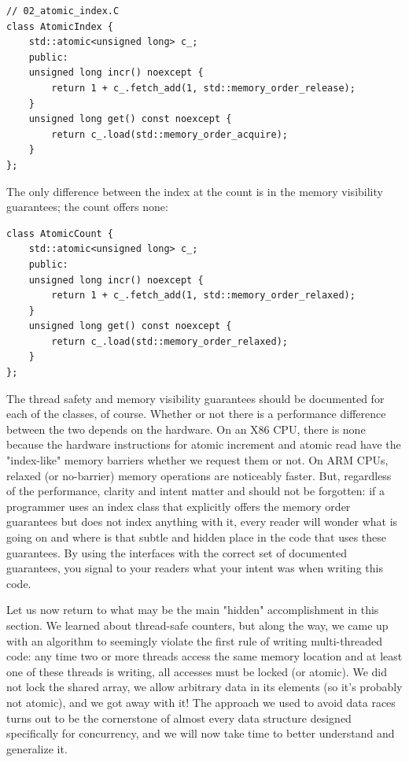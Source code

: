 \begin{lstlisting}[style=styleCXX]
// 02_atomic_index.C
class AtomicIndex {
	std::atomic<unsigned long> c_;
	public:
	unsigned long incr() noexcept {
		return 1 + c_.fetch_add(1, std::memory_order_release);
	}
	unsigned long get() const noexcept {
		return c_.load(std::memory_order_acquire);
	}
};
\end{lstlisting}

The only difference between the index at the count is in the memory visibility guarantees; the count offers none:

\begin{lstlisting}[style=styleCXX]
class AtomicCount {
	std::atomic<unsigned long> c_;
	public:
	unsigned long incr() noexcept {
		return 1 + c_.fetch_add(1, std::memory_order_relaxed);
	}
	unsigned long get() const noexcept {
		return c_.load(std::memory_order_relaxed);
	}
};
\end{lstlisting}

The thread safety and memory visibility guarantees should be documented for each of the classes, of course. Whether or not there is a performance difference between the two depends on the hardware. On an X86 CPU, there is none because the hardware instructions for atomic increment and atomic read have the "index-like" memory barriers whether we request them or not. On ARM CPUs, relaxed (or no-barrier) memory operations are noticeably faster. But, regardless of the performance, clarity and intent matter and should not be forgotten: if a programmer uses an index class that explicitly offers the memory order guarantees but does not index anything with it, every reader will wonder what is going on and where is that subtle and hidden place in the code that uses these guarantees. By using the interfaces with the correct set of documented guarantees, you signal to your readers what your intent was when writing this code.

Let us now return to what may be the main "hidden" accomplishment in this section. We learned about thread-safe counters, but along the way, we came up with an algorithm to seemingly violate the first rule of writing multi-threaded code: any time two or more threads access the same memory location and at least one of these threads is writing, all accesses must be locked (or atomic). We did not lock the shared array, we allow arbitrary data in its elements (so it's probably not atomic), and we got away with it! The approach we used to avoid data races turns out to be the cornerstone of almost every data structure designed specifically for concurrency, and we will now take time to better understand and generalize it.

